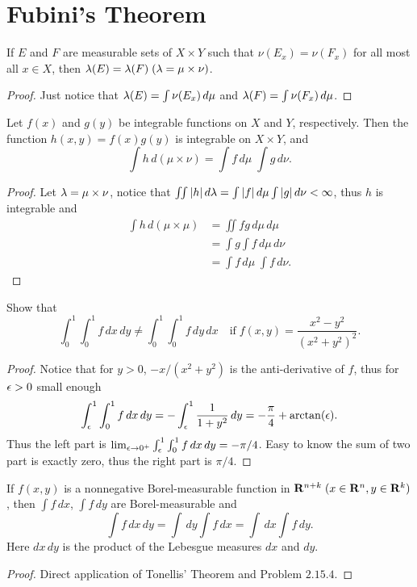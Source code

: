 \section{Fubini's Theorem}
\begin{pro}%
	If $E$ and $F$ are measurable sets of $X\times Y$ such that $\nu(E_x)=\nu(F_x)$ for all most all $x\in X$, then $\lambda(E)=\lambda(F)\;(\lambda=\mu\times\nu)$.
\end{pro}
\begin{proof}
	Just notice that $\lambda(E)=\int \nu(E_x)\,d\mu$ and $\lambda(F)=\int \nu(F_x)\,d\mu$.
\end{proof}

\begin{pro}%
	Let $f(x)$ and $g(y)$ be integrable functions on $X$ and $Y$, respectively. Then the function $h(x,y)=f(x)g(y)$ is integrable on $X\times Y$, and
	\[\int h\,d(\mu\times\nu)=\int f\,d\mu\;\int g\,d\nu.\]
\end{pro}
\begin{proof}
	Let $\lambda=\mu\times \nu$, notice that $\iint |h|\,d\lambda=\int |f|\,d\mu\int |g|\,d\nu<\infty$, thus $h$ is integrable and 
	\begin{align*}
	\int h\,d(\mu\times \mu)&=\iint fg\,d\mu\,d\mu\\
	&=\int g\int f\,d\mu\,d\nu\\
	&=\int f\,d\mu\;\int f\,d\nu.
	\end{align*}
\end{proof}

\begin{pro}%
	Show that
	\[\int_0^1\int_0^1 f\,dx\,dy\neq \int_0^1\int_0^1 f\,dy\,dx\quad \mbox{if}\;f(x,y)=\frac{x^2-y^2}{(x^2+y^2)^2}.\]
\end{pro}
\begin{proof}
	Notice that for $y>0$, $-x/(x^2+y^2)$ is the anti-derivative of $f$, thus for $\epsilon>0$ small enough
	\[\int_{\epsilon}^1\int_0^1 f\,dx\,dy=-\int_{\epsilon}^1 \frac{1}{1+y^2}\,dy=-\frac{\pi}{4}+\arctan(\epsilon).\]
	Thus the left part is $\lim_{\epsilon\to0^+} \int_{\epsilon}^1\int_0^1 f\,dx\,dy=-\pi/4$. Easy to know the sum of two part is exactly zero, thus the right part is $\pi/4$.
\end{proof}

\begin{pro}%
	If $f(x,y)$ is a nonnegative Borel-measurable function in $\mathbf{R}^{n+k}\;(x\in\mathbf{R}^n,y\in\mathbf{R}^k)$, then $\int f\,dx$, $\int f\,dy$ are Borel-measurable and 
	\[\int f\,dx\,dy=\int\,dy\int f\,dx=\int\,dx\int f\,dy.\]
	Here $dx\,dy$ is the product of the Lebesgue measures $dx$ and $dy$.
\end{pro}
\begin{proof}
	Direct application of Tonellis' Theorem and Problem $2.15.4$.
\end{proof}

